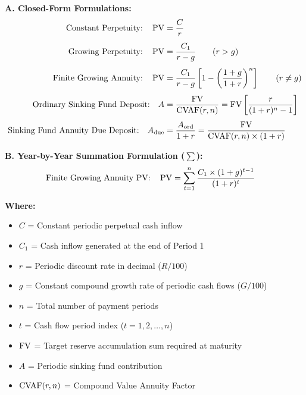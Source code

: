 \newpage
\begin{formulabox}
\textbf{A. Closed-Form Formulations:}
\begin{align*}
    \text{Constant Perpetuity:} \quad \operatorname{PV} &= \frac{C}{r} \\[4pt]
    \text{Growing Perpetuity:} \quad \operatorname{PV} &= \frac{C_1}{r - g} \qquad (r > g) \\[4pt]
    \text{Finite Growing Annuity:} \quad \operatorname{PV} &= \frac{C_1}{r - g} \left[ 1 - \left(\frac{1 + g}{1 + r}\right)^n \right] \qquad (r \ne g) \\[4pt]
    \text{Ordinary Sinking Fund Deposit:} \quad A &= \frac{\operatorname{FV}}{\operatorname{CVAF}(r, n)} = \operatorname{FV} \left[ \frac{r}{(1 + r)^n - 1} \right] \\[4pt]
    \text{Sinking Fund Annuity Due Deposit:} \quad A_{\text{due}} &= \frac{A_{\text{ord}}}{1 + r} = \frac{\operatorname{FV}}{\operatorname{CVAF}(r, n) \times (1 + r)}
\end{align*}

\vspace{0.2em}
\textbf{B. Year-by-Year Summation Formulation ($\sum$):}
\begin{align*}
    \text{Finite Growing Annuity PV:} \quad \operatorname{PV} &= \sum_{t=1}^{n} \frac{C_1 \times (1 + g)^{t-1}}{(1 + r)^t}
\end{align*}

\textbf{Where:}
\begin{itemize}[noitemsep, topsep=2pt]
    \item $C$ = Constant periodic perpetual cash inflow
    \item $C_1$ = Cash inflow generated at the end of Period 1
    \item $r$ = Periodic discount rate in decimal ($R/100$)
    \item $g$ = Constant compound growth rate of periodic cash flows ($G/100$)
    \item $n$ = Total number of payment periods
    \item $t$ = Cash flow period index ($t = 1, 2, \dots, n$)
    \item $\operatorname{FV}$ = Target reserve accumulation sum required at maturity
    \item $A$ = Periodic sinking fund contribution
    \item $\operatorname{CVAF}(r, n)$ = Compound Value Annuity Factor
\end{itemize}
\end{formulabox}

